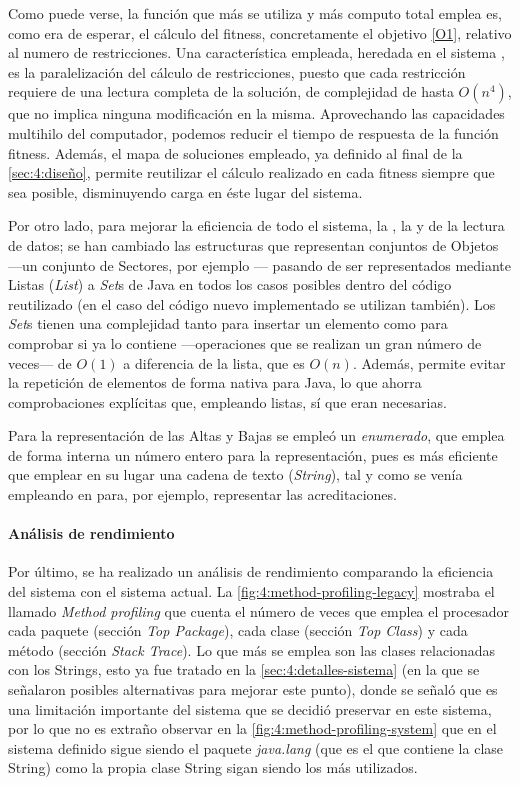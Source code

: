 Como puede verse, la función que más se utiliza y más computo total emplea es, como era de esperar, el cálculo del fitness, concretamente el objetivo \ref{O1}, relativo al numero de restricciones. Una característica empleada, heredada en el sistema \legacy{}, es la paralelización del cálculo de restricciones, puesto que cada restricción requiere de una lectura completa de la solución, de complejidad de hasta $O(n^4)$, que no implica ninguna modificación en la misma. Aprovechando las capacidades multihilo del computador, podemos reducir el tiempo de respuesta de la función fitness. Además, el mapa de soluciones empleado, ya definido al final de la \autoref{sec:4:diseño}, permite reutilizar el cálculo realizado en cada fitness siempre que sea posible, disminuyendo carga en éste lugar del sistema.

Por otro lado, para mejorar la eficiencia de todo el sistema, la \faseuno{}, la \fasedos{} y de la lectura de datos; se han cambiado las estructuras que representan conjuntos de Objetos ---un conjunto de Sectores, por ejemplo --- pasando de ser representados mediante Listas (\textit{List}) a \textit{Set}s de Java en todos los casos posibles dentro del código \legacy{} reutilizado (en el caso del código nuevo implementado se utilizan también). Los \textit{Set}s tienen una complejidad tanto para insertar un elemento como para comprobar si ya lo contiene ---operaciones que se realizan un gran número de veces--- de $O(1)$ a diferencia de la lista, que es $O(n)$. Además, permite evitar la repetición de elementos de forma nativa para Java, lo que ahorra comprobaciones explícitas que, empleando listas, sí que eran necesarias.

Para la representación de las Altas y Bajas se empleó un \textit{enumerado}, que emplea de forma interna un número entero para la representación, pues es más eficiente que emplear en su lugar una cadena de texto (\textit{String}), tal y como se venía empleando en \legacy{} para, por ejemplo, representar las acreditaciones.

\paragraph{Análisis de rendimiento}
Por último, se ha realizado un análisis de rendimiento comparando la eficiencia del sistema \legacy{} con el sistema actual. La \autoref{fig:4:method-profiling-legacy} mostraba el llamado \textit{Method profiling} que cuenta el número de veces que emplea el procesador cada paquete (sección \textit{Top Package}), cada clase (sección \textit{Top Class}) y cada método (sección \textit{Stack Trace}). Lo que más se emplea son las clases relacionadas con los Strings, esto ya fue tratado en la \autoref{sec:4:detalles-sistema} (en la que se señalaron posibles alternativas para mejorar este punto), donde se señaló que es una limitación importante del sistema que se decidió preservar en este sistema, por lo que no es extraño observar en la \autoref{fig:4:method-profiling-system} que en el sistema definido sigue siendo el paquete \textit{java.lang} (que es el que contiene la clase String) como la propia clase String sigan siendo los más utilizados.

